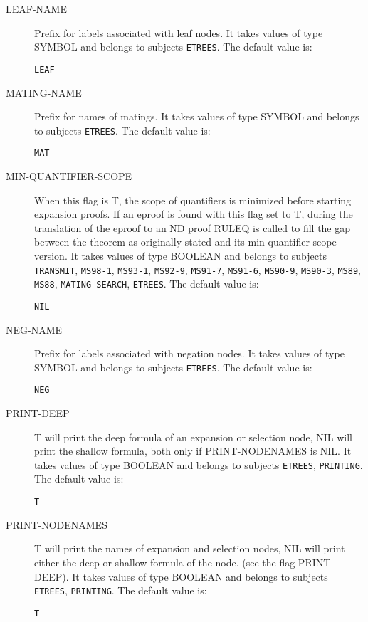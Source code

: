 \begin{description}
\item[LEAF-NAME]  
Prefix for labels associated with leaf nodes.
It takes values of type SYMBOL and belongs to subjects \texttt{ETREES}.  The default value is: \begin{lstlisting}
LEAF
\end{lstlisting}

\item[MATING-NAME]  
Prefix for names of matings.
It takes values of type SYMBOL and belongs to subjects \texttt{ETREES}.  The default value is: \begin{lstlisting}
MAT
\end{lstlisting}

\item[MIN-QUANTIFIER-SCOPE]  
When this flag is T, the scope of quantifiers is minimized before
    starting expansion proofs.
If an eproof is found with this flag set to T, during the translation
of the eproof to an ND proof RULEQ is called to fill the gap between
the theorem as originally stated and its min-quantifier-scope version.
It takes values of type BOOLEAN and belongs to subjects \texttt{TRANSMIT}, \texttt{MS98-1}, \texttt{MS93-1}, \texttt{MS92-9}, \texttt{MS91-7}, \texttt{MS91-6}, \texttt{MS90-9}, \texttt{MS90-3}, \texttt{MS89}, \texttt{MS88}, \texttt{MATING-SEARCH}, \texttt{ETREES}.  The default value is: \begin{lstlisting}
NIL
\end{lstlisting}

\item[NEG-NAME]  
Prefix for labels associated with negation nodes.
It takes values of type SYMBOL and belongs to subjects \texttt{ETREES}.  The default value is: \begin{lstlisting}
NEG
\end{lstlisting}

\item[PRINT-DEEP]  
T will print the deep formula of an expansion or selection node,
NIL will print the shallow formula, both only if PRINT-NODENAMES is NIL.
It takes values of type BOOLEAN and belongs to subjects \texttt{ETREES}, \texttt{PRINTING}.  The default value is: \begin{lstlisting}
T
\end{lstlisting}

\item[PRINT-NODENAMES]  
T will print the names of expansion and selection nodes,
NIL will print either the deep or shallow formula of the node.
(see the flag PRINT-DEEP).
It takes values of type BOOLEAN and belongs to subjects \texttt{ETREES}, \texttt{PRINTING}.  The default value is: \begin{lstlisting}
T
\end{lstlisting}


\end{description}
